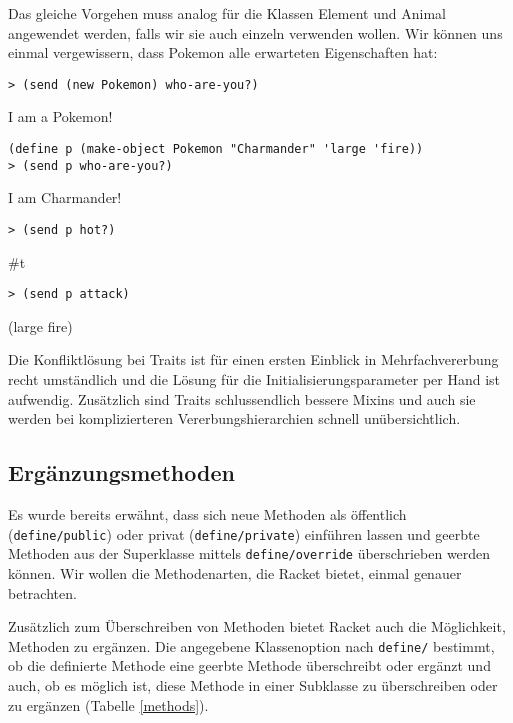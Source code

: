 Das gleiche Vorgehen muss analog für die Klassen Element und Animal angewendet werden, falls wir sie auch einzeln verwenden wollen. Wir können uns einmal vergewissern, dass Pokemon alle erwarteten Eigenschaften hat:

\begin{lstlisting}
> (send (new Pokemon) who-are-you?)
\end{lstlisting}
{\routput {\qq}I am a Pokemon!\qq}

\begin{lstlisting}
(define p (make-object Pokemon "Charmander" 'large 'fire))
> (send p who-are-you?)
\end{lstlisting}
{\routput {\qq}I am Charmander!\qq}

\begin{lstlisting}
> (send p hot?)
\end{lstlisting}
{\routput \#t}

\begin{lstlisting}
> (send p attack)
\end{lstlisting}
{\rsymbol (large fire)}

Die Konfliktlösung bei Traits ist für einen ersten Einblick in Mehrfachvererbung recht umständlich und die Lösung für die Initialisierungsparameter per Hand ist aufwendig. Zusätzlich sind Traits schlussendlich bessere Mixins und auch sie werden bei komplizierteren Vererbungshierarchien schnell unübersichtlich.

\subsection{Ergänzungsmethoden}

Es wurde bereits erwähnt, dass sich neue Methoden als öffentlich (\texttt{define/public}) oder privat (\texttt{define/private}) einführen lassen und geerbte Methoden aus der Superklasse mittels \texttt{define/override} überschrieben werden können. Wir wollen die Methodenarten, die Racket bietet, einmal genauer betrachten. 

Zusätzlich zum Überschreiben von Methoden bietet Racket auch die Möglichkeit, Methoden zu ergänzen. Die angegebene Klassenoption nach \texttt{define/} bestimmt, ob die definierte Methode eine geerbte Methode überschreibt oder ergänzt und auch, ob es möglich ist, diese Methode in einer Subklasse zu überschreiben oder zu ergänzen (Tabelle \ref{methods}).

